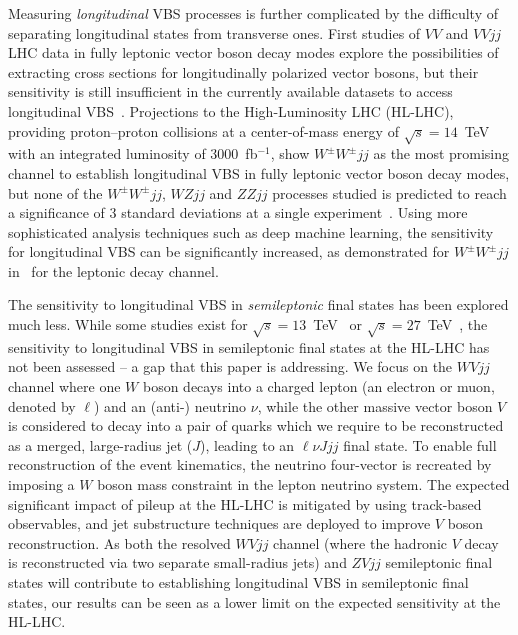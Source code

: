 \documentclass[amsmath,amssymb,aps,prd,preprint,groupedaddress]{revtex4-2}
\begin{document}
Measuring {\em longitudinal} VBS processes is further complicated by the difficulty of separating longitudinal states from transverse ones.
First studies of $VV$ and $VVjj$ LHC data in fully leptonic vector boson decay modes explore the possibilities of 
extracting cross sections for longitudinally polarized vector bosons, but their sensitivity is still insufficient in the currently 
available datasets to access longitudinal VBS~\cite{Aaboud:2019gxl,Sirunyan:2020gvn}. 
Projections to the High-Luminosity LHC (HL-LHC), providing proton--proton collisions at a center-of-mass
energy of $\sqrt{s} = 14$~TeV with an integrated luminosity of 3000~fb$^{-1}$, show $W^\pm W^\pm jj$ as the most promising
channel to establish longitudinal VBS in fully leptonic vector boson decay modes, but none of the $W^\pm W^\pm jj$, $W Zjj$ 
and $ZZ jj$ processes studied is predicted to reach a significance of 3 standard deviations at a single experiment~\cite{CMSCollaboration:2015zni,
CMS:2018mbt,CMS:2018ylh,ATLAS:2018tav,CMS:2018zxa,ATLAS:2018uld}.
Using more sophisticated analysis techniques such as  deep machine learning, the sensitivity for longitudinal VBS can be significantly increased,
as demonstrated for $W^\pm W^\pm jj$ in~\cite{Searcy:2015apa} for the leptonic decay channel.

The sensitivity to longitudinal VBS in {\em semileptonic} final states has been explored much less. While some studies
exist for $\sqrt{s} = 13$~TeV~\cite{Grossi:2020orx} or $\sqrt{s} = 27$~TeV~\cite{Cavaliere:2018zcf},
the sensitivity to longitudinal VBS in semileptonic final states at the HL-LHC has not been assessed -- a gap that this
paper is addressing. We focus on the $W V jj$ channel where one $W$ boson decays into a charged lepton (an electron or muon, denoted 
by $\ell$) and an (anti-) neutrino $\nu$, while the other massive vector boson $V$ is considered to decay into a pair of quarks which we require 
to be reconstructed as a merged, large-radius jet ($J$), leading to an $\ell\nu J jj$ final state. To enable full reconstruction of the event kinematics, 
the neutrino four-vector is recreated by imposing a $W$ boson mass constraint in the lepton neutrino system. The expected significant impact
of pileup at the HL-LHC is mitigated by using track-based observables, and jet substructure techniques are deployed to improve $V$ boson reconstruction.
As both the resolved $W V jj$ channel (where the hadronic $V$ decay is reconstructed via two separate small-radius jets) and $ZV jj$ semileptonic 
final states will contribute to establishing longitudinal VBS in semileptonic final states, our results can be seen as a lower limit on the expected sensitivity
at the HL-LHC. 
\end{document}
